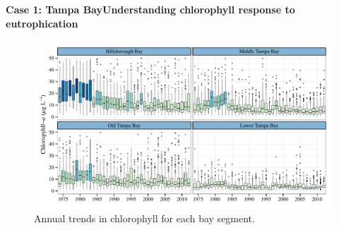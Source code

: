 \documentclass[serif]{beamer}\usepackage[]{graphicx}\usepackage[]{color}
\begin{document}
\begin{frame}{\textbf{Case 1: Tampa Bay}}{\textbf{Understanding chlorophyll response to eutrophication}}
\begin{figure}[!ht]

{\centering \includegraphics[width=\linewidth]{fig/annual_chl-1} 

}

\caption[Annual trends in chlorophyll for each bay segment]{Annual trends in chlorophyll for each bay segment.}\label{fig:annual_chl}
\end{figure}


\end{frame}

\end{document}
